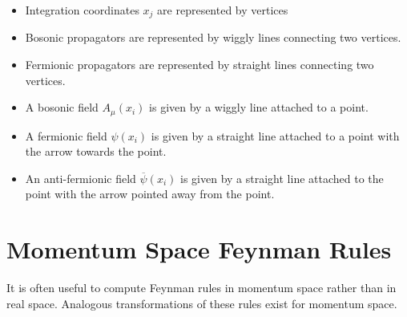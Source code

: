 \documentclass[book.tex]{subfiles}
\begin{document}
\begin{itemize}
    \item Integration coordinates $x_j$ are represented by vertices
    \item Bosonic propagators are represented by wiggly lines connecting two vertices.
    \item Fermionic propagators are represented by straight lines connecting two vertices.
    \item A bosonic field $A_\mu(x_i)$ is given by a wiggly line attached to a point.
    \item A fermionic field $\psi(x_i)$ is given by a straight line attached to a point with the arrow towards the point. 
    \item An anti-fermionic field $\overline{\psi}(x_i)$ is given by a straight line attached to the point with the arrow pointed away from the point.
\end{itemize}

\section{Momentum Space Feynman Rules}

It is often useful to compute Feynman rules in momentum space rather than in real space. Analogous transformations of these rules exist for momentum space.
\end{document}
